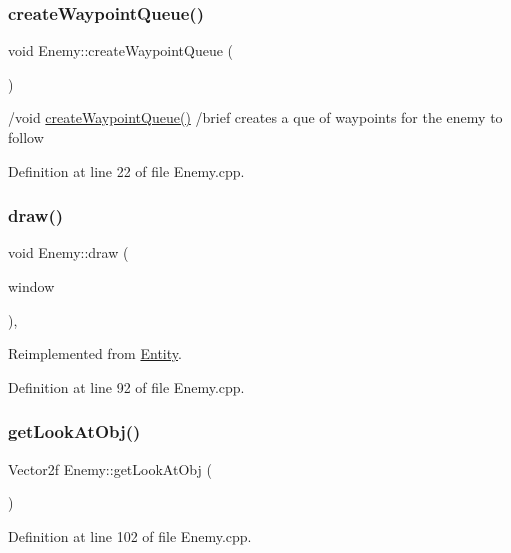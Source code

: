 \subsubsection{\texorpdfstring{create\+Waypoint\+Queue()}{createWaypointQueue()}}
{\footnotesize\ttfamily void Enemy\+::create\+Waypoint\+Queue (\begin{DoxyParamCaption}{ }\end{DoxyParamCaption})}

/void \hyperlink{class_enemy_a9c48b3be7c2ebbb7dce8b45183299895}{create\+Waypoint\+Queue()} /brief creates a que of waypoints for the enemy to follow 

Definition at line 22 of file Enemy.\+cpp.

\mbox{\label{class_enemy_a582d09158d692070f4becf68220bf6b6}} 
\subsubsection{\texorpdfstring{draw()}{draw()}}
{\footnotesize\ttfamily void Enemy\+::draw (\begin{DoxyParamCaption}\item[{Render\+Window \&}]{window }\end{DoxyParamCaption})\hspace{0.3cm}{\ttfamily [override]}, {\ttfamily [virtual]}}



Reimplemented from \hyperlink{class_entity_a030c3aa6641df7981a2d8a3fba890ec7}{Entity}.



Definition at line 92 of file Enemy.\+cpp.

\mbox{\label{class_enemy_aa55a89207573ebad16ba1556b105d692}} 
\subsubsection{\texorpdfstring{get\+Look\+At\+Obj()}{getLookAtObj()}}
{\footnotesize\ttfamily Vector2f Enemy\+::get\+Look\+At\+Obj (\begin{DoxyParamCaption}{ }\end{DoxyParamCaption})}



Definition at line 102 of file Enemy.\+cpp.

